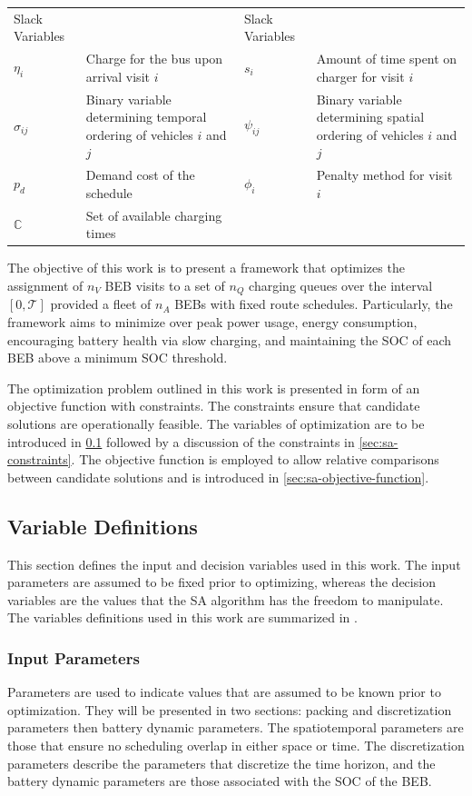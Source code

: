 \documentclass[ee,thesis]{usuthesis}
\newcommand{\T}{\mathcal{T}}                %
\newcommand{\C}{\mathbb{C}}                 %
\begin{document}
\begin{table}[htbp]
\begin{tabularx}{\textwidth}{L{0.3} L{1.2} L{0.3} L{1.2}}
Slack Variables &  & Slack Variables & \\[0pt]
\(\eta_i\) & Charge for the bus upon arrival visit \(i\) & \(s_i\) & Amount of time spent on charger for visit \(i\)\\[0pt]
\(\sigma_{ij}\) & Binary variable determining temporal ordering of vehicles \(i\) and \(j\) & \(\psi_{ij}\) & Binary variable determining spatial ordering of vehicles \(i\) and \(j\)\\[0pt]
\(p_{d}\) & Demand cost of the schedule & \(\phi_i\) & Penalty method for visit \(i\)\\[0pt]
\(\C\) & Set of available charging times &  & \\[0pt]
\hline
\end{tabularx}
\end{table}
The objective of this work is to present a framework that optimizes the assignment of \(n_V\) BEB visits to a set of \(n_Q\)
charging queues over the interval \([0,\T]\) provided a fleet of \(n_A\) BEBs with fixed route schedules. Particularly, the
framework aims to minimize over peak power usage, energy consumption, encouraging battery health via slow charging, and
maintaining the SOC of each BEB above a minimum SOC threshold.

The optimization problem outlined in this work is presented in form of an objective function with constraints. The
constraints ensure that candidate solutions are operationally feasible. The variables of optimization are to be
introduced in \ref{sec:sa-parameter-definitions} followed by a discussion of the constraints in \ref{sec:sa-constraints}. The
objective function is employed to allow relative comparisons between candidate solutions and is introduced in
\ref{sec:sa-objective-function}.

\subsection{Variable Definitions}
\label{sec:sa-parameter-definitions}
This section defines the input and decision variables used in this work. The input parameters are assumed to be fixed
prior to optimizing, whereas the decision variables are the values that the SA algorithm has the freedom to manipulate.
The variables definitions used in this work are summarized in .

\subsubsection{Input Parameters}
\label{sec:sa-input-variables}
Parameters are used to indicate values that are assumed to be known prior to optimization. They will be presented in two
sections: packing and discretization parameters then battery dynamic parameters. The spatiotemporal parameters are those
that ensure no scheduling overlap in either space or time. The discretization parameters describe the parameters that
discretize the time horizon, and the battery dynamic parameters are those associated with the SOC of the BEB.
\end{document}
